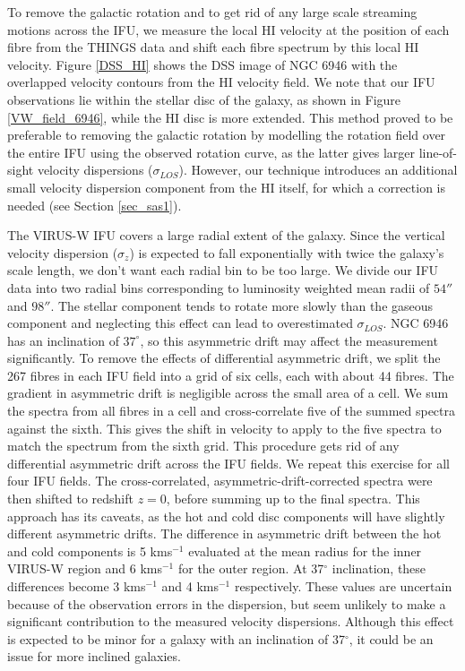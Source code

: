\documentclass[fleqn,usenatbib]{mnras}
\begin{document}
To remove the galactic rotation and to get rid of any large scale streaming motions across the IFU, we measure the local HI velocity at the position of each fibre from the THINGS data \citep{things} and shift each fibre spectrum by this local HI velocity. Figure \ref{DSS_HI} shows the DSS image of NGC 6946 with the overlapped velocity contours from the HI velocity field. We note that our IFU observations lie within the stellar disc of the galaxy, as shown in Figure \ref{VW_field_6946}, while the HI disc is more extended.
This method proved to be preferable to removing the galactic rotation by modelling the rotation field over the entire IFU using the observed rotation curve, as the latter gives larger line-of-sight velocity dispersions ($\sigma_{LOS}$). 
However, our technique introduces an additional small velocity dispersion component from %
the HI itself, for which a correction is needed (see Section \ref{sec_sas1}).

The VIRUS-W %
IFU covers a large radial extent of the galaxy. Since the vertical velocity dispersion ($\sigma_z$) is expected to fall exponentially with twice the galaxy's scale length, we don't want each radial bin to be too large.  We divide our IFU data into two radial bins corresponding to %
luminosity weighted mean radii of $54''$ and $98''$. The stellar component tends to rotate more slowly than the gaseous component and neglecting this effect can lead to overestimated $\sigma_{LOS}$. NGC 6946 has an inclination of $37^{\circ}$, so this asymmetric drift may affect the measurement significantly. 
To remove the effects of differential asymmetric drift, %
we split the 267 fibres in each IFU field into a grid of six cells, each with about 44 fibres. 
The gradient in asymmetric drift is negligible across the small area of a cell. We sum the spectra from all fibres in a cell and cross-correlate five of the summed spectra against the sixth. This gives the shift in velocity to apply to the five spectra to match the spectrum from the sixth grid. This procedure gets rid of any differential asymmetric drift across the IFU fields. We repeat this exercise for all four IFU fields. The cross-correlated, asymmetric-drift-corrected spectra were then shifted to redshift $z = 0$, before summing up to the final spectra.
This approach has its caveats, as the hot and cold disc components will have slightly different asymmetric drifts. The difference in asymmetric drift between the hot and cold components is 5 kms$^{-1}$ evaluated at the mean radius for the inner VIRUS-W region and 6 kms$^{-1}$ for the outer region.  At 37$^\circ$ inclination, these differences become 3 kms$^{-1}$ and 4 kms$^{-1}$ respectively. These values are uncertain because of the observation errors in the dispersion, but seem unlikely to make a significant contribution to the measured velocity dispersions.
Although this effect is expected to be minor for a galaxy with an inclination of 37$^\circ$, it could be an issue for more inclined galaxies.
\end{document}
